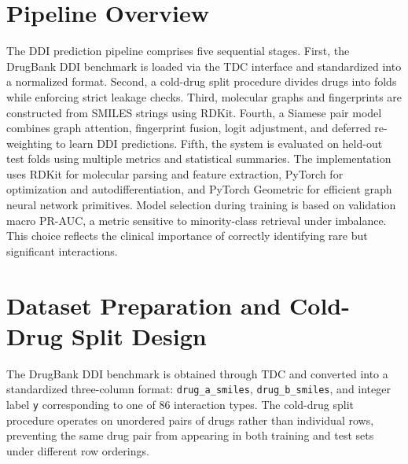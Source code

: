 \documentclass[11pt,a4paper]{report}
\begin{document}
\section{Pipeline Overview}
The DDI prediction pipeline comprises five sequential stages. First, the DrugBank DDI benchmark is loaded via the TDC interface and standardized into a normalized format. Second, a cold-drug split procedure divides drugs into folds while enforcing strict leakage checks. Third, molecular graphs and fingerprints are constructed from SMILES strings using RDKit. Fourth, a Siamese pair model combines graph attention, fingerprint fusion, logit adjustment, and deferred re-weighting to learn DDI predictions. Fifth, the system is evaluated on held-out test folds using multiple metrics and statistical summaries. The implementation uses RDKit for molecular parsing and feature extraction, PyTorch for optimization and autodifferentiation, and PyTorch Geometric for efficient graph neural network primitives. Model selection during training is based on validation macro PR-AUC, a metric sensitive to minority-class retrieval under imbalance. This choice reflects the clinical importance of correctly identifying rare but significant interactions.
\section{Dataset Preparation and Cold-Drug Split Design}
The DrugBank DDI benchmark is obtained through TDC and converted into a standardized three-column format: \texttt{drug\_a\_smiles}, \texttt{drug\_b\_smiles}, and integer label \texttt{y} corresponding to one of 86 interaction types. The cold-drug split procedure operates on unordered pairs of drugs rather than individual rows, preventing the same drug pair from appearing in both training and test sets under different row orderings.
\end{document}

